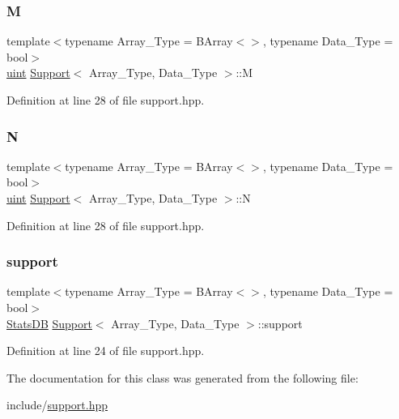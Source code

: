 \subsubsection{\texorpdfstring{M}{M}}
{\footnotesize\ttfamily template$<$typename Array\+\_\+\+Type  = B\+Array$<$$>$, typename Data\+\_\+\+Type  = bool$>$ \\
\hyperlink{typedefs_8hpp_a91ad9478d81a7aaf2593e8d9c3d06a14}{uint} \hyperlink{class_support}{Support}$<$ Array\+\_\+\+Type, Data\+\_\+\+Type $>$\+::M}



Definition at line 28 of file support.\+hpp.

\mbox{\label{class_support_ab15c7125d6b99ae15ec4dbb34c9ce9b6}} 
\subsubsection{\texorpdfstring{N}{N}}
{\footnotesize\ttfamily template$<$typename Array\+\_\+\+Type  = B\+Array$<$$>$, typename Data\+\_\+\+Type  = bool$>$ \\
\hyperlink{typedefs_8hpp_a91ad9478d81a7aaf2593e8d9c3d06a14}{uint} \hyperlink{class_support}{Support}$<$ Array\+\_\+\+Type, Data\+\_\+\+Type $>$\+::N}



Definition at line 28 of file support.\+hpp.

\mbox{\label{class_support_ab2f404c7c11d5bc58e876124cc52d073}} 
\subsubsection{\texorpdfstring{support}{support}}
{\footnotesize\ttfamily template$<$typename Array\+\_\+\+Type  = B\+Array$<$$>$, typename Data\+\_\+\+Type  = bool$>$ \\
\hyperlink{class_stats_d_b}{Stats\+DB} \hyperlink{class_support}{Support}$<$ Array\+\_\+\+Type, Data\+\_\+\+Type $>$\+::support}



Definition at line 24 of file support.\+hpp.



The documentation for this class was generated from the following file\+:\begin{DoxyCompactItemize}
\item 
include/\hyperlink{support_8hpp}{support.\+hpp}\end{DoxyCompactItemize}
